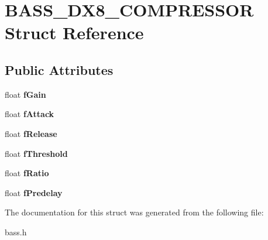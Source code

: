 \section{B\+A\+S\+S\+\_\+\+D\+X8\+\_\+\+C\+O\+M\+P\+R\+E\+S\+S\+O\+R Struct Reference}
\label{struct_b_a_s_s___d_x8___c_o_m_p_r_e_s_s_o_r}
\subsection*{Public Attributes}
\begin{DoxyCompactItemize}
\item 
float {\bfseries f\+Gain}\label{struct_b_a_s_s___d_x8___c_o_m_p_r_e_s_s_o_r_a9d35e7c7ad2df73b081f31ceee1defcc}

\item 
float {\bfseries f\+Attack}\label{struct_b_a_s_s___d_x8___c_o_m_p_r_e_s_s_o_r_a7ad66e4cd902035feff1050abeaf7f35}

\item 
float {\bfseries f\+Release}\label{struct_b_a_s_s___d_x8___c_o_m_p_r_e_s_s_o_r_a342f2aac54617c7cedb1cef24e504859}

\item 
float {\bfseries f\+Threshold}\label{struct_b_a_s_s___d_x8___c_o_m_p_r_e_s_s_o_r_a16e3551549e24df55d0f97cb7d67f048}

\item 
float {\bfseries f\+Ratio}\label{struct_b_a_s_s___d_x8___c_o_m_p_r_e_s_s_o_r_adb827cf9d2693779c096cf22761ace59}

\item 
float {\bfseries f\+Predelay}\label{struct_b_a_s_s___d_x8___c_o_m_p_r_e_s_s_o_r_adeacc7ea3f0433fc478b91943a0a695d}

\end{DoxyCompactItemize}


The documentation for this struct was generated from the following file\+:\begin{DoxyCompactItemize}
\item 
bass.\+h\end{DoxyCompactItemize}
